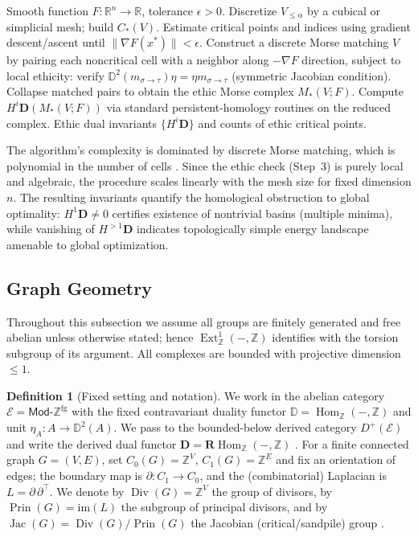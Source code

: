 \documentclass[12pt]{article}
\DeclareMathOperator{\Div}{Div}
\DeclareMathOperator{\Prin}{Prin}
\DeclareMathOperator{\Jac}{Jac}
\newcommand{\RR}{\mathbb{R}}
\newcommand{\E}{\mathcal{E}}
\newcommand{\Mod}{\mathsf{Mod}}
\newcommand{\ZZ}{\mathbb{Z}}
\newcommand{\DD}{\mathbb{D}}
\newcommand{\Hom}{\operatorname{Hom}}
\newcommand{\Ext}{\operatorname{Ext}}
\newcommand{\RHom}{\mathbf{R}\!\operatorname{Hom}}
\newcommand{\Dplus}{D^{+}}
\theoremstyle{plain}
\theoremstyle{definition}
\newtheorem{definition}[theorem]{Definition}
\theoremstyle{remark}
\numberwithin{equation}{section}
\begin{document}
\begin{algorithm}[H]
\caption{Ethic Morse Reduction (Nonconvex Case)}
\begin{algorithmic}[1]
\REQUIRE Smooth function $F:\RR^n\to\RR$, tolerance $\epsilon>0$.
\STATE Discretize $V_{\le\alpha}$ by a cubical or simplicial mesh; build $C_\ast(V)$.
\STATE Estimate critical points and indices using gradient descent/ascent until $\|\nabla F(x^\ast)\|<\epsilon$.
\STATE Construct a discrete Morse matching $V$ by pairing each noncritical cell with a neighbor along $-\nabla F$ direction, subject to local ethicity:  
verify $\DD^2(m_{\sigma\to\tau})\eta=\eta m_{\sigma\to\tau}$ (symmetric Jacobian condition).
\STATE Collapse matched pairs to obtain the ethic Morse complex $M_\ast(V;F)$.
\STATE Compute $H^i\mathbf D(M_\ast(V;F))$ via standard persistent-homology routines on the reduced complex.
\ENSURE Ethic dual invariants $\{H^i\mathbf D\}$ and counts of ethic critical points.
\end{algorithmic}
\end{algorithm}

The algorithm's complexity is dominated by discrete Morse matching, which is polynomial in the number of cells \cite{Forman1998}.  Since the ethic check (Step~3) is purely local and algebraic, the procedure scales linearly with the mesh size for fixed dimension $n$.  The resulting invariants quantify the homological obstruction to global optimality: $H^1\mathbf D\neq0$ certifies existence of nontrivial basins (multiple minima), while vanishing of $H^{>1}\mathbf D$ indicates topologically simple energy landscape amenable to global optimization.

\subsection{Graph Geometry}\label{subsec:kirchhoff-rr-derived}

Throughout this subsection we assume all groups are finitely generated
and free abelian unless otherwise stated; hence $\Ext^1_\ZZ(-,\ZZ)$
identifies with the torsion subgroup of its argument.
All complexes are bounded with projective dimension~$\le1$.

\begin{definition}[Fixed setting and notation]
We work in the abelian category $\E=\Mod\text{-}\ZZ^{\mathrm{fg}}$ with the fixed contravariant duality functor $\DD=\Hom_{\ZZ}(-,\ZZ)$ and unit $\eta_A:A\to \DD^2(A)$. We pass to the bounded-below derived category $\Dplus(\E)$ and write the derived dual functor $\mathbf D=\RHom_{\ZZ}(-,\ZZ)$ \cite{Weibel1994,GelfandManin2003}. For a finite connected graph $G=(V,E)$, set $C_0(G)=\ZZ^{V}$, $C_1(G)=\ZZ^{E}$ and fix an orientation of edges; the boundary map is $\partial:C_1\to C_0$, and the (combinatorial) Laplacian is $L=\partial\,\partial^\top$. We denote by $\Div(G)=\ZZ^{V}$ the group of divisors, by $\Prin(G)=\mathrm{im}(L)$ the subgroup of principal divisors, and by $\Jac(G)=\Div(G)/\Prin(G)$ the Jacobian (critical/sandpile) group \cite{Biggs1993,Dhar1990,BakerNorine2007}.
\end{definition}
\end{document}
